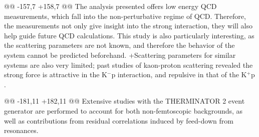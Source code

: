 @@ -157,7 +158,7 @@
 The \LamK analysis presented offers low energy QCD measurements, which fall into the non-perturbative regime of QCD.
 Therefore, the \LamK measurements not only give insight into the strong interaction, they will also help guide future QCD calculations.
 This study is also particularly interesting, as the \LamK scattering parameters are not known, and therefore the behavior of the system cannot be predicted beforehand.
\sout{}
+Scattering parameters for similar systems are also very limited; past studies of kaon-proton scattering revealed the strong force is attractive in the K$^{-}$p interaction, and repulsive in that of the K$^{+}$p \cite{Humphrey:1962zz, Hadjimichef:2002xe, Ikeda:2012au}.
 

@@ -181,11 +182,11 @@
 Extensive studies with the THERMINATOR 2 event generator are performed to account for both non-femtoscopic backgrounds, as well as contributions from residual correlations induced by feed-down from resonances.
 
